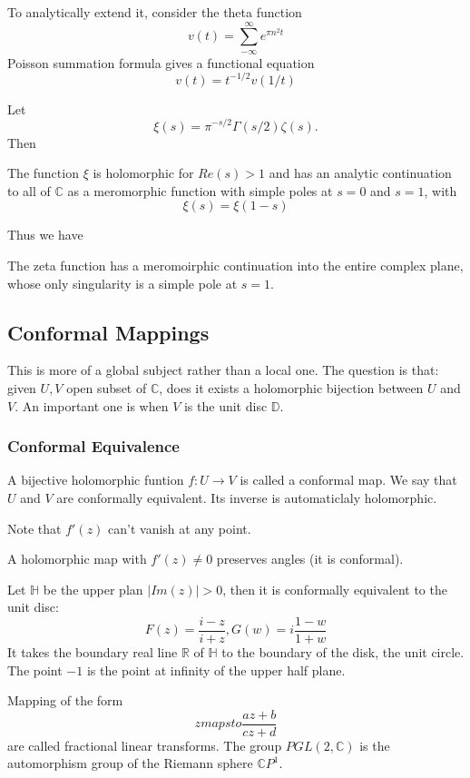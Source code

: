 \documentclass[main.tex]{subfiles}
\begin{document}
To analytically extend it, consider the theta function 
$$
v(t) = \sum_{-\infty} ^{\infty} e^{\pi n^2 t}
$$
Poisson summation formula gives a functional equation 
$$
v(t) = t^{-1/2} v(1/t)
$$

Let 
$$
\xi(s) = \pi^{-s/2}\Gamma(s/2)\zeta(s).
$$
Then 
\begin{theorem}
The function $\xi$ is holomorphic for $Re(s) > 1$ and has an analytic continuation to all of $\mathbb{C}$ as a meromorphic function with simple poles at $s = 0$ and $s = 1$, with 
$$
\xi(s) = \xi(1-s)
$$
\end{theorem}

Thus we have 
\begin{theorem}
The zeta function has a meromoirphic continuation into the entire complex plane, whose only singularity is a simple pole at $s = 1$.
\end{theorem}


\subsection{Conformal Mappings}
This is more of a global subject rather than a local one. The question is that: given $U, V$ open subset of $\mathbb{C}$, does it exists a holomorphic bijection between $U$ and $V$. An important one is when $V$ is the unit disc $\mathbb{D}$.

\subsubsection{Conformal Equivalence}
A bijective holomorphic funtion $f: U \rightarrow V$ is called a conformal map. We say that $U$ and $V$ are conformally equivalent. Its inverse is automaticlaly holomorphic.

Note that $f'(z)$ can't vanish at any point.

A holomorphic map with $f'(z) \neq 0$ preserves angles (it is conformal).

\begin{example}
Let $\mathbb{H}$ be the upper plan $|Im (z)| > 0$, then it is conformally equivalent to the unit disc:
$$
F(z) = \frac{i -z}{i + z}, G(w) = i \frac{1-w}{1+w}
$$
It takes the boundary real line $\mathbb{R}$ of $\mathbb{H}$ to the boundary of the disk, the unit circle. The point $-1$ is the point at infinity of the upper half plane.
\end{example}

Mapping of the form 
$$
z mapsto \frac{az + b}{cz + d}
$$
are called fractional linear transforms. The group $PGL(2, \mathbb{C})$ is the automorphism group of the Riemann sphere $\mathbb{C}P^1$.
\end{document}
